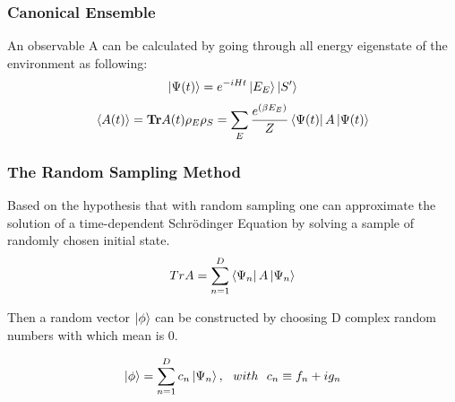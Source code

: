 \documentclass{beamer}
\begin{document}
\begin{frame}
	\frametitle{Canonical Ensemble}
	An observable A can be calculated by going through all energy eigenstate of the environment as following:\\
	
	\begin{equation*}
	\begin{split}
	\label{psi_assemble_method}
	\ket{\Psi(t)}&=e^{-iHt} \ket{E_E}\ket{S'}\\
	\end{split}
	\end{equation*}
	\begin{equation*}
	\langle A(t)\rangle = \mathbf{Tr} A(t) \rho_E \rho_S= \sum_{E}\frac{e^{(\beta E_E)}}{Z}\bra{\Psi(t)}A\ket{\Psi(t)}
	\end{equation*}
	
\end{frame}

\begin{frame}
	\frametitle{The Random Sampling Method}
	Based on the hypothesis that with random sampling one can approximate the solution of a time-dependent Schrödinger Equation by solving a sample of randomly chosen initial state.
	\begin{equation*}
	\begin{split}
	TrA=\sum_{n=1}^{D} \bra{\Psi_n}A\ket{\Psi_n}\\
	\end{split}
	\end{equation*}
	
	Then a random vector $\ket{\phi}$ can be constructed by choosing D complex random numbers with which mean is 0.
	
	\begin{equation*}
	\begin{split}
	\ket{\phi}= \sum_{n=1}^{D} c_n \ket{{\Psi_n}}, ~~ with ~~c_n \equiv f_n + i g_n\\
	\end{split}
	\end{equation*}
\end{frame}
\end{document}
